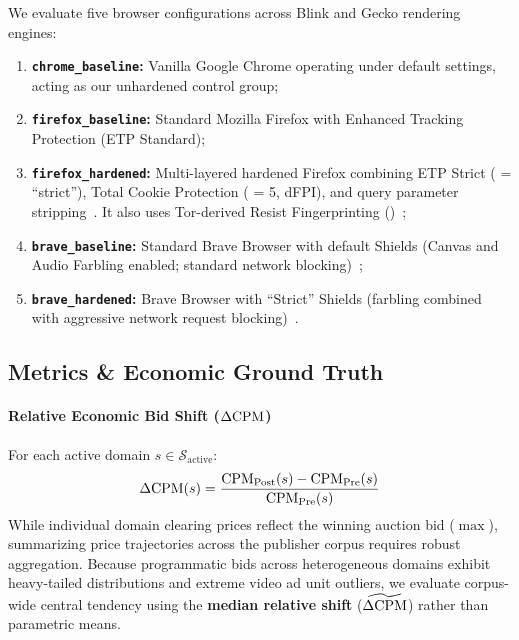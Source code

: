 We evaluate five browser configurations across Blink and Gecko rendering engines:
\begin{enumerate}
    \item \textbf{\texttt{chrome\_baseline}:} Vanilla Google Chrome operating under default settings, acting as our unhardened control group;
    \item \textbf{\texttt{firefox\_baseline}:} Standard Mozilla Firefox with Enhanced Tracking Protection (ETP Standard);
    \item \textbf{\texttt{firefox\_hardened}:} Multi-layered hardened Firefox combining ETP Strict ( = ``strict''), Total Cookie Protection ( = 5, dFPI), and query parameter stripping~\cite{randall2022measuring}. It also uses Tor-derived Resist Fingerprinting ()~\cite{tor_design, torbrowser_normalization_2019, mozilla_rfp_docs};
    \item \textbf{\texttt{brave\_baseline}:} Standard Brave Browser with default Shields (Canvas and Audio Farbling enabled; standard network blocking)~\cite{brave_fingerprinting_protections_2025};
    \item \textbf{\texttt{brave\_hardened}:} Brave Browser with ``Strict'' Shields (farbling combined with aggressive network request blocking)~\cite{brave_fingerprinting_protections_2025}.
\end{enumerate}
\subsection{Metrics \& Economic Ground Truth}
\label{subsec:metrics}

\paragraph{Relative Economic Bid Shift ($\Delta\text{CPM}$)}
For each active domain $s \in \mathcal{S}_{\text{active}}$:
\begin{equation}
\Delta\text{CPM}(s) = \frac{\text{CPM}_{\text{Post}}(s) - \text{CPM}_{\text{Pre}}(s)}{\text{CPM}_{\text{Pre}}(s)}
\end{equation}
While individual domain clearing prices reflect the winning auction bid ($\max$), summarizing price trajectories across the publisher corpus requires robust aggregation. 
Because programmatic bids across heterogeneous domains exhibit heavy-tailed distributions and extreme video ad unit outliers, we evaluate corpus-wide central tendency using the \textbf{median relative shift} ($\widetilde{\Delta\text{CPM}}$) rather than parametric means.

